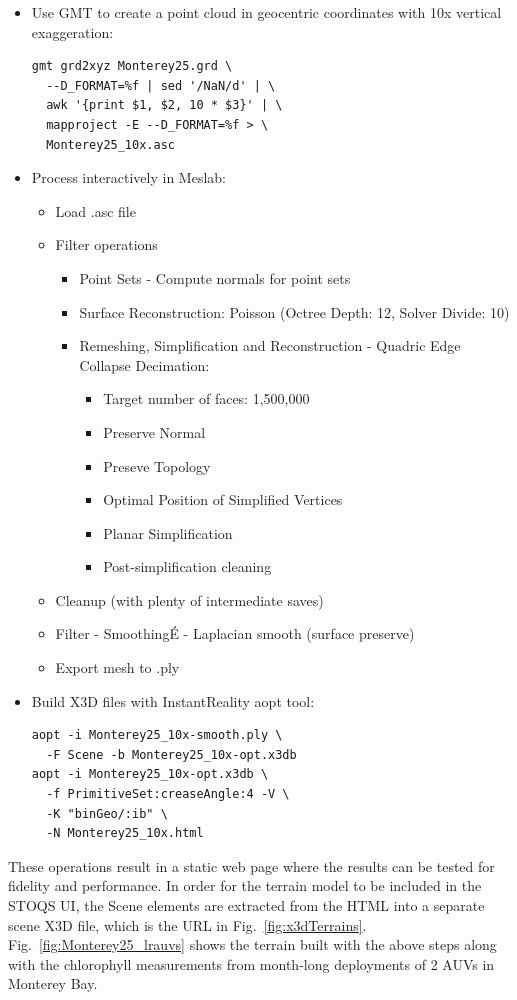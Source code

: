 \documentclass[conference]{IEEEtran}
\begin{document}
\begin{itemize}
\item Use GMT to create a point cloud in geocentric coordinates with 10x vertical exaggeration:
\begin{verbatim}
gmt grd2xyz Monterey25.grd \
  --D_FORMAT=%f | sed '/NaN/d' | \
  awk '{print $1, $2, 10 * $3}' | \ 
  mapproject -E --D_FORMAT=%f > \
  Monterey25_10x.asc
\end{verbatim}
\item Process interactively in Meslab:
\begin{itemize}
\item Load .asc file
\item Filter operations
\begin{itemize}
\item Point Sets - Compute normals for point sets
\item Surface Reconstruction: Poisson (Octree Depth: 12, Solver Divide: 10)
\item Remeshing, Simplification and Reconstruction - Quadric Edge Collapse Decimation:
\begin{itemize}
\item Target number of faces: 1,500,000
\item Preserve Normal
\item Preseve Topology
\item Optimal Position of Simplified Vertices
\item Planar Simplification
\item Post-simplification cleaning
\end{itemize}
\end{itemize}
\item Cleanup (with plenty of intermediate saves)
\item Filter - SmoothingÉ - Laplacian smooth (surface preserve)
\item Export mesh to .ply
\end{itemize}
\item Build X3D files with InstantReality aopt tool:
\begin{verbatim}
aopt -i Monterey25_10x-smooth.ply \
  -F Scene -b Monterey25_10x-opt.x3db
aopt -i Monterey25_10x-opt.x3db \
  -f PrimitiveSet:creaseAngle:4 -V \
  -K "binGeo/:ib" \
  -N Monterey25_10x.html
\end{verbatim}
\end{itemize}

These operations result in a static web page where the results can be tested for fidelity and performance. In order for the terrain model to be included in the STOQS UI, the Scene elements are extracted from the HTML into a separate scene X3D file, which is the URL in Fig.~\ref{fig:x3dTerrains}. Fig.~\ref{fig:Monterey25_lrauvs} shows the terrain built with the above steps along with the chlorophyll measurements from month-long deployments of 2 AUVs in Monterey Bay.
\end{document}
